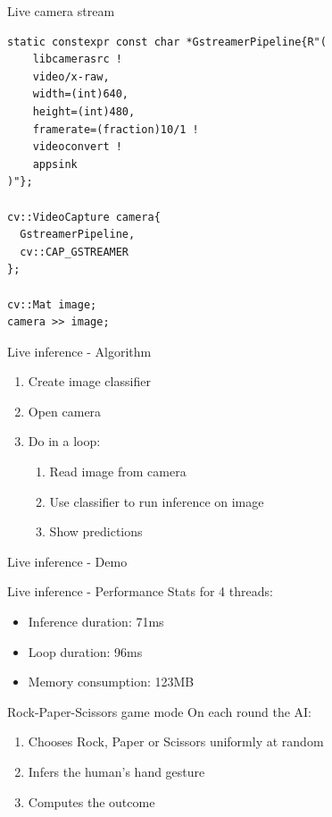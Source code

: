 \begin{frame}[fragile]{Live camera stream}
  \lstset{basicstyle=\ttfamily\small, showstringspaces=false, numbers=left,
  columns=fullflexible}
  \begin{lstlisting}
static constexpr const char *GstreamerPipeline{R"(
    libcamerasrc !
    video/x-raw,
    width=(int)640,
    height=(int)480,
    framerate=(fraction)10/1 !
    videoconvert !
    appsink
)"};

cv::VideoCapture camera{
  GstreamerPipeline,
  cv::CAP_GSTREAMER
};

cv::Mat image;
camera >> image;
  \end{lstlisting}
\end{frame}

\begin{frame}{Live inference - Algorithm}
  \begin{enumerate}
	\item Create image classifier
	\item Open camera
	\item Do in a loop:
	\begin{enumerate}
	  \item Read image from camera
	  \item Use classifier to run inference on image
	  \item Show predictions
	\end{enumerate}
  \end{enumerate}
\end{frame}

\begin{frame}{Live inference - Demo}
\end{frame}

\begin{frame}{Live inference - Performance}
Stats for 4 threads:
  \begin{itemize}
	\item Inference duration: 71ms
	\item Loop duration: 96ms
	\item Memory consumption: 123MB
  \end{itemize}
\end{frame}

\begin{frame}{Rock-Paper-Scissors game mode}
On each round the AI:
  \begin{enumerate}
	\item Chooses Rock, Paper or Scissors uniformly at random
	\item Infers the human's hand gesture
	\item Computes the outcome
  \end{enumerate}
\end{frame}

